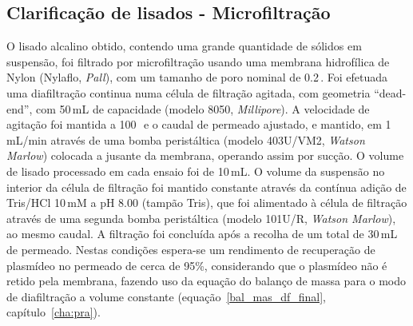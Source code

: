 \subsection{Clarificação de lisados - Microfiltração} %
\label{ssub:2.2art4}
%
O lisado alcalino obtido, contendo uma grande quantidade de sólidos em suspensão, foi filtrado por microfiltração usando uma membrana hidrofílica de Nylon (Nylaflo, \emph{Pall}), com um tamanho de poro nominal de 0.2\,\micro\meter.
%
%
Foi efetuada uma diafiltração continua numa célula de filtração agitada, com geometria ``dead-end'', com 50\,mL de capacidade (modelo 8050, \emph{Millipore}).
%
A velocidade de agitação foi mantida a 100\,\minmum\ e o caudal de permeado ajustado, e mantido, em 1\,mL/min através de uma bomba peristáltica (modelo 403U/VM2, \emph{Watson Marlow}) colocada a jusante da membrana, operando assim por sucção.
%
%
%
O volume de lisado processado em cada ensaio foi de 10\,mL. O volume da suspensão no interior da célula de filtração foi mantido constante através da contínua adição de Tris/HCl 10\,mM a pH 8.00 (tampão Tris), que foi alimentado à célula de filtração através de uma segunda bomba peristáltica (modelo 101U/R, \emph{Watson Marlow}), ao mesmo caudal.
%
A filtração foi concluída após a recolha de um total de 30\,mL de permeado. Nestas condições espera-se um rendimento de recuperação de plasmídeo no permeado de cerca de 95\%, considerando que o plasmídeo não é retido pela membrana, fazendo uso da equação do balanço de massa para o modo de diafiltração a volume constante (equação~\ref{bal_mas_df_final}, capítulo~\ref{cha:pra}).
%
%

